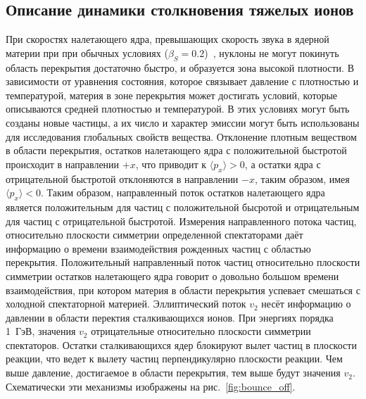 \subsection{Описание динамики столкновения тяжелых ионов}

При скоростях налетающего ядра, превышающих скорость звука в ядерной материи при при обычных условиях ($\beta_S=0.2$)~\cite{Weber:1998aa}, нуклоны не могут покинуть область перекрытия достаточно быстро, и образуется зона высокой плотности.
В зависимости от уравнения состояния, которое связывает давление с плотностью и температурой, материя в зоне перекрытия может достигать условий, которые описываются средней плотностью и температурой.
В этих условиях могут быть созданы новые частицы, а их число и характер эмиссии могут быть использованы для исследования глобальных свойств вещества.
Отклонение плотным веществом в области перекрытия, остатков налетающего ядра с положительной быстротой происходит в направлении $+x$, что приводит к $\langle p_x \rangle  > 0$, а остатки ядра с отрицательной быстротой отклоняются в направлении $-x$, таким образом, имея $\langle p_x \rangle < 0$.
Таким образом, направленный поток остатков налетающего ядра является положительным для частиц с положительной бысротой и отрицательным для частиц с отрицательной быстротой.
Измерения направленного потока частиц, относительно плоскости симметрии определенной спектаторами даёт информацию о времени взаимодействия рожденных частиц с областью перекрытия.
Положительный направленный поток частиц относительно плоскости симметрии остатков налетающего ядра говорит о довольно большом времени взаимодействия, при котором материя в области перекрытия успевает смешаться с холодной спектаторной материей.
Эллиптический поток $v_2$ несёт информацию о давлении в области перектия сталкивающихся ионов.
При энергиях порядка 1~ГэВ, значения $v_2$ отрицательные относительно плоскости симметрии спектаторов.
Остатки сталкивающихся ядер блокируют вылет частиц в плоскости реакции, что ведет к вылету частиц перпендикулярно плоскости реакции.
Чем выше давление, достигаемое в области перекрытия, тем выше будут значения $v_2$.
Схематически эти механизмы изображены на рис.~\ref{fig:bounce_off}.
%
